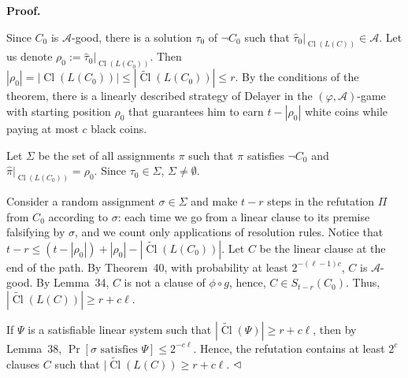 \par\medskip\noindent\textbf{
Proof.}\par


Since $C_{0}$ is $\mathcal{A}$-good, there is a solution $\tau_{0}$ of $\lnot C_{0}$ such that $\hat{\tau}_{0}|_{\mathop{\mathrm{Cl}}(L(C))}\in\mathcal{A}$. Let us denote $\rho_{0}:=\hat{\tau}_{0}|_{\mathop{\mathrm{Cl}}(L(C_{0}))}$.
Then $|\rho_{0}|=|\mathop{\mathrm{Cl}}(L(C_{0}))|\leq|\widetilde{\mathop{\mathrm{Cl}}}(L(C_{0}))|\leq r$.
By the conditions of the theorem, there is a linearly described strategy of Delayer in the $(\varphi,\mathcal{A})$-game with starting position $\rho_{0}$ that guarantees him to earn $t-|\rho_{0}|$ white coins while paying at most $c$ black coins.\par



Let $\Sigma$ be the set of all assignments $\pi$ such that $\pi$ satisfies $\lnot C_{0}$ and $\hat{\pi}|_{\mathop{\mathrm{Cl}}(L(C_{0}))}=\rho_{0}$. Since $\tau_{0}\in\Sigma$, $\Sigma\neq\emptyset$.\par



Consider a random assignment $\sigma\in\Sigma$ and make $t-r$ steps in the refutation $\Pi$
from $C_{0}$ according to $\sigma$: each time we go from a linear clause to its premise falsifying by $\sigma$, and we count only applications of resolution rules. Notice that $t-r\leq(t-|\rho_{0}|)+|\rho_{0}|-|\widetilde{\mathop{\mathrm{Cl}}}(L(C_{0}))|$. Let $C$ be the linear clause at the end of the path.
By Theorem 40,
with probability at least $2^{-(\ell-1)c}$, $C$ is $\mathcal{A}$-good. By Lemma 34, $C$ is not a clause of $\phi\circ g$, hence, $C\in S_{t-r}(C_{0})$. Thus, $|\widetilde{\mathop{\mathrm{Cl}}}(L(C))|\geq r+c\ell$.\par



If $\Psi$ is a satisfiable linear system such that $|\widetilde{\mathop{\mathrm{Cl}}}(\Psi)|\geq r+c\ell$, then by Lemma 38, $\Pr[\mbox{$\sigma$ satisfies $\Psi$}]\leq 2^{-c\ell}$. Hence, the refutation contains at least $2^{c}$ clauses $C$ such that $|\widetilde{\mathop{\mathrm{Cl}}}(L(C))\geq r+c\ell$.
$\hfill\vartriangleleft$\par



